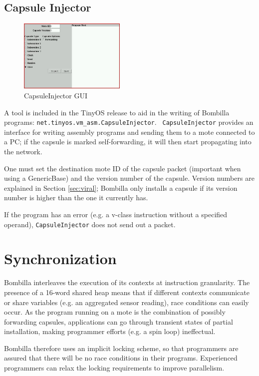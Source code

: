 \documentclass[10pt]{article}
\begin{document}
\subsection{Capsule Injector}

\begin{figure}
\begin{center}
\includegraphics[width=2in]{fig/CapsuleInjector.jpg}
\caption{CapsuleInjector GUI}
\label{fig:capsuleinject}
\end{center}
\end{figure}

A tool is included in the TinyOS release to aid in the writing of
Bombilla programs: {\tt net.tinyos.vm\_asm.CapsuleInjector}. {\tt
CapsuleInjector} provides an interface for writing assembly programs
and sending them to a mote connected to a PC; if the capsule is marked
self-forwarding, it will then start propagating into the network.

One must set the destination mote ID of the capsule packet (important
when using a GenericBase) and the version number of the
capsule. Version numbers are explained in Section \ref{sec:viral};
Bombilla only installs a capsule if its version number is higher than
the one it currently has.

If the program has an error (e.g. a v-class instruction without a
specified operand), {\tt CapsuleInjector} does not send out a packet.

\section{Synchronization}

Bombilla interleaves the execution of its contexts at instruction
granularity. The presence of a 16-word shared heap means that if
different contexts communicate or share variables (e.g. an aggregated
sensor reading), race conditions can easily occur. As the program
running on a mote is the combination of possibly forwarding capsules,
applications can go through transient states of partial installation,
making programmer efforts (e.g. a spin loop) ineffectual.

Bombilla therefore uses an implicit locking scheme, so that
programmers are assured that there will be no race conditions in their
programs. Experienced programmers can relax the locking requirements
to improve parallelism.
\end{document}
